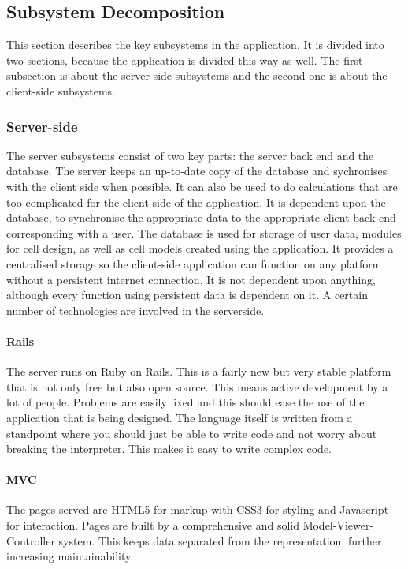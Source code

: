 \documentclass{report}
\begin{document}
		\subsection{Subsystem Decomposition}
			This section describes the key subsystems in the application. It is divided into two sections, because the application is divided this way as well. The first subsection is about the server-side subsystems and the second one is about the client-side subsystems.
			\subsubsection{Server-side}
				The server subsystems consist of two key parts: the server back end and the database. The server keeps an up-to-date copy of the database and sychronises with the client side when possible. It can also be used to do calculations that are too complicated for the client-side of the application. It is dependent upon the database, to synchronise the appropriate data to the appropriate client back end corresponding with a user.
				The database is used for storage of user data, modules for cell design, as well as cell models created using the application. It provides a centralised storage so the client-side application can function on any platform without a persistent internet connection. It is not dependent upon anything, although every function using persistent data is dependent on it. 
				A certain number of technologies are involved in the serverside.
				\paragraph{Rails}
					The server runs on Ruby on Rails. This is a fairly new but very stable platform that is not only free but also open source. This means active development by a lot of people. Problems are easily fixed and this should ease the use of the application that is being designed. The language itself is written from a standpoint where you should just be able to write code and not worry about breaking the interpreter. This makes it easy to write complex code.
				\paragraph{MVC}
					The pages served are HTML5 for markup with CSS3 for styling and Javascript for interaction. Pages are built by a comprehensive and solid Model-Viewer-Controller system. This keeps data separated from the representation, further increasing maintainability. 
\end{document}
